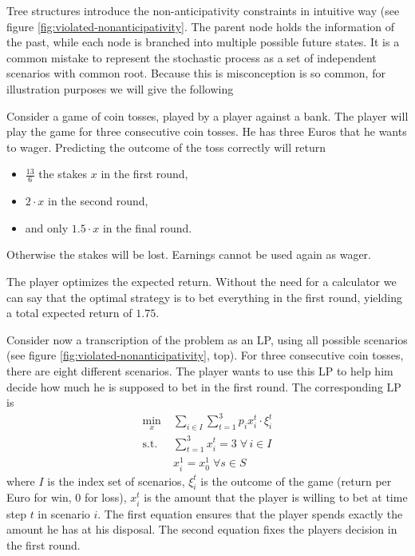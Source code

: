 Tree structures introduce the non-anticipativity constraints in intuitive way (see figure \ref{fig:violated-nonanticipativity}.
The parent node holds the information of the past, while each node is branched into multiple possible future states.
It is a common mistake to represent the stochastic process as a set of independent scenarios with common root.
Because this is misconception is so common, for illustration purposes we will give the following
\begin{example}
  \label{ex:tree-necessity}
  Consider a game of coin tosses, played by a player against a bank.
  The player will play the game for three consecutive coin tosses.
  He has three Euros that he wants to wager.
  Predicting the outcome of the toss correctly will return
  \begin{itemize}
  \item $\frac{13}{6}$ the stakes $x$ in the first round,
  \item $2\cdot x$ in the second round,
  \item and only $1.5\cdot x$ in the final round.
  \end{itemize}
  Otherwise the stakes will be lost.
  Earnings cannot be used again as wager.

  The player optimizes the expected return.
  Without the need for a calculator we can say that the optimal strategy is to bet everything in the first round, yielding a total expected return of $1.75$.

  Consider now a transcription of the problem as an LP, using all possible scenarios (see figure \ref{fig:violated-nonanticipativity}, top).
  For three consecutive coin tosses, there are eight different scenarios.
  The player wants to use this LP to help him decide how much he is supposed to bet in the first round.
  The corresponding LP is
  \begin{align*}
    \min\limits_x &\; \sum_{i\in I}\sum_{t=1}^3p_ix_i^t\cdot \xi_i^t\\
    \text{s.t.} &\; \sum_{t=1}^3x_i^t = 3 \;\forall\, i\in I\\
    & \; x_i^1 = x_0^1\;\forall s\in S
  \end{align*}
  where $I$ is the index set of scenarios, $\xi_i^t$ is the outcome of the game (return per Euro for win, $0$ for loss), $x_i^t$ is the amount that the player is willing to bet at time step $t$ in scenario $i$. The first equation ensures that the player spends exactly the amount he has at his disposal. The second equation fixes the players decision in the first round.


\end{example}
